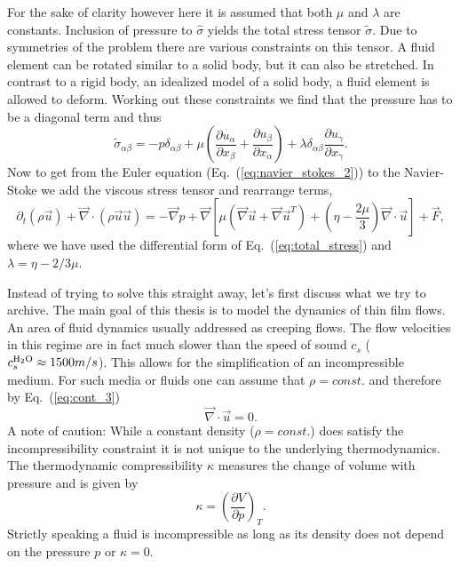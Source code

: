 For the sake of clarity however here it is assumed that both $\mu$ and $\lambda$ are constants.
Inclusion of pressure to $\hat{\sigma}$ yields the total stress tensor $\tilde{\sigma}$. 
Due to symmetries of the problem there are various constraints on this tensor.
A fluid element can be rotated similar to a solid body, but it can also be stretched. 
In contrast to a rigid body, an idealized model of a solid body, a fluid element is allowed to deform.
Working out these constraints we find that the pressure has to be a diagonal term and thus
\begin{equation}\label{eq:total_stress}
    \tilde{\sigma}_{\alpha\beta} = - p \delta_{\alpha\beta} + \mu\left(\frac{\partial u_{\alpha}}{\partial x_{\beta}} + \frac{\partial u_{\beta}}{\partial x_{\alpha}}\right) + \lambda\delta_{\alpha\beta}\frac{\partial u_{\gamma}}{\partial x_{\gamma}}.
\end{equation}
Now to get from the Euler equation (Eq.~(\ref{eq:navier_stokes_2})) to the Navier-Stoke we add the viscous stress tensor and rearrange terms,
\begin{equation}\label{eq:navier_stokes_3}
    \partial_t(\rho\vec{u}) + \vec{\nabla}\cdot(\rho\vec{u}\vec{u}) = - \vec{\nabla} p + \vec{\nabla}\left[\mu(\vec{\nabla}\vec{u} + \vec{\nabla}\vec{u}^T) + \left(\eta-\frac{2\mu}{3}\right)\vec{\nabla}\cdot\vec{u}\right] + \vec{F},
\end{equation}
where we have used the differential form of Eq.~(\ref{eq:total_stress}) and $\lambda = \eta - 2/3\mu$.

Instead of trying to solve this straight away, let's first discuss what we try to archive.
The main goal of this thesis is to model the dynamics of thin film flows.
An area of fluid dynamics usually addressed as creeping flows. 
The flow velocities in this regime are in fact much slower than the speed of sound $c_s$ ($c_s^{\ce{H2O}} \approx 1500m/s $). 
This allows for the simplification of an incompressible medium.
For such media or fluids one can assume that $\rho = const.$ and therefore by Eq.~(\ref{eq:cont_3}) 
\begin{equation}\label{eq:incomp}
    \vec{\nabla}\cdot\vec{u} = 0.
\end{equation}
A note of caution: While a constant density ($\rho = const.$) does satisfy the incompressibility constraint it is not unique to the underlying thermodynamics.
The thermodynamic compressibility $\kappa$ measures the change of volume with pressure and is given by 
\begin{equation}
    \kappa = \left(\frac{\partial V}{\partial p}\right)_T.
\end{equation}
Strictly speaking a fluid is incompressible as long as its density does not depend on the pressure $p$ or $\kappa = 0$.

